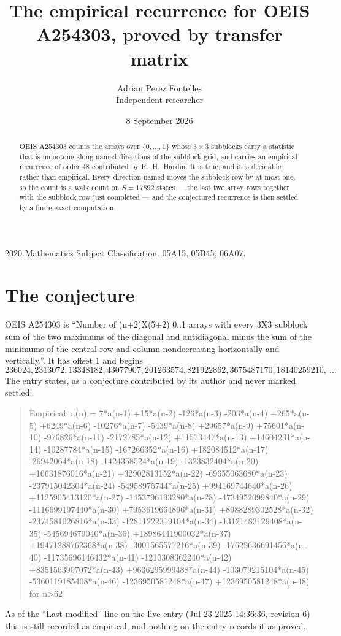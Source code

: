 \documentclass[11pt,a4paper]{article}
\title{The empirical recurrence for OEIS A254303, proved by transfer matrix}
\author{Adrian Perez Fontelles\\ \small Independent researcher}
\date{8 September 2026}
\theoremstyle{plain}
\theoremstyle{definition}
\begin{document}
\maketitle

\begin{abstract}
OEIS A254303 counts the arrays over $\{0,\dots,1\}$ whose $3\times3$ subblocks carry a
statistic that is monotone along named directions of the subblock grid, and carries an
empirical recurrence of order $48$ contributed by R.~H.~Hardin. It is true, and it is
decidable rather than empirical. Every direction named moves the subblock row by at most one,
so the count is a walk count on $S=17892$ states --- the last two array rows together with the
subblock row just completed --- and the conjectured recurrence is then settled by a finite
exact computation.
\end{abstract}

\noindent\small 2020 Mathematics Subject Classification. 05A15, 05B45, 06A07.\normalsize

\section{The conjecture}

OEIS A254303 is ``Number of (n+2)X(5+2) 0..1 arrays with every 3X3 subblock sum of the two maximums of the diagonal and antidiagonal minus the sum of the minimums of the central row and column nondecreasing horizontally and vertically.''. It has offset $1$ and begins
\[
236024, 2313072, 13348182, 43077907, 201263574, 821922862, 3675487170, 18140259210,\ \dots
\]
The entry states, as a conjecture contributed by its author and never marked settled:
\begin{quote}
Empirical: a(n) = 7*a(n-1) +15*a(n-2) -126*a(n-3) -203*a(n-4) +265*a(n-5) +6249*a(n-6) -10276*a(n-7) -5439*a(n-8) +29657*a(n-9) +75601*a(n-10) -976826*a(n-11) -2172785*a(n-12) +11573447*a(n-13) +14604231*a(n-14) -10287784*a(n-15) -167266352*a(n-16) +182084512*a(n-17) -26942064*a(n-18) -1424358524*a(n-19) -1323832404*a(n-20) +16631876016*a(n-21) +32902813152*a(n-22) -69655063680*a(n-23) -237915042304*a(n-24) -54958975744*a(n-25) +994169744640*a(n-26) +1125905413120*a(n-27) -1453796193280*a(n-28) -4734952099840*a(n-29) -1116699197440*a(n-30) +7953619664896*a(n-31) +8988289302528*a(n-32) -2374581026816*a(n-33) -12811222319104*a(n-34) -13121482129408*a(n-35) -545694679040*a(n-36) +18986441900032*a(n-37) +19471288762368*a(n-38) -3001565577216*a(n-39) -17622636691456*a(n-40) -11735696146432*a(n-41) -1210308362240*a(n-42) +8351563907072*a(n-43) +9636295999488*a(n-44) -103079215104*a(n-45) -5360119185408*a(n-46) -1236950581248*a(n-47) +1236950581248*a(n-48) for n>62
\end{quote}
As of the ``Last modified'' line on the live entry (Jul 23 2025 14:36:36, revision 6) this is still
recorded as empirical, and nothing on the entry records it as proved.
\end{document}
